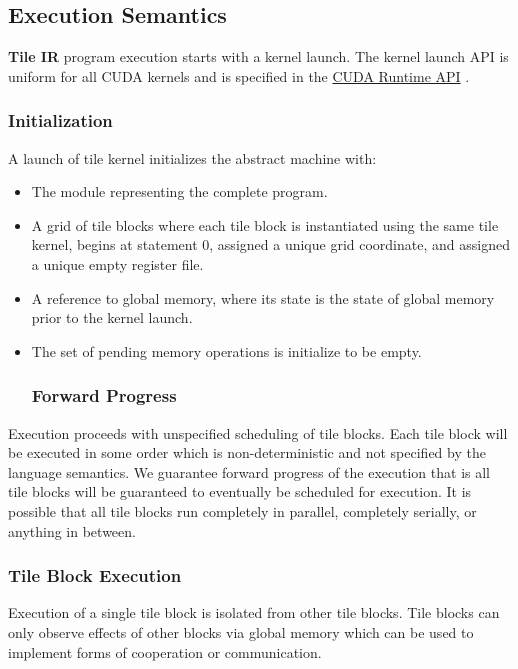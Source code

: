 \documentclass{article}
\begin{document}
\subsection{Execution Semantics}

\textbf{Tile IR} program execution starts with a kernel launch. The kernel launch API is uniform for all CUDA kernels and is specified in the \href{https://docs.nvidia.com/cuda/cuda-runtime-api/index.html}{CUDA Runtime API} .


\subsubsection{Initialization}

A launch of tile kernel initializes the abstract machine with:


\begin{itemize}
\item The module representing the complete program.
\item A grid of tile blocks where each tile block is instantiated using the same tile kernel, begins at statement 0, assigned a unique grid coordinate, and assigned a unique empty register file.
\item A reference to global memory, where its state is the state of global memory prior to the kernel launch.
\item The set of pending memory operations is initialize to be empty.


\subsubsection{Forward Progress}

\end{itemize}
Execution proceeds with unspecified scheduling of tile blocks. Each tile block will be executed in some order which is non-deterministic and not specified by the language semantics. We guarantee forward progress of the execution that is all tile blocks will be guaranteed to eventually be scheduled for execution. It is possible that all tile blocks run completely in parallel, completely serially, or anything in between.



\subsubsection{Tile Block Execution}

Execution of a single tile block is isolated from other tile blocks. Tile blocks can only observe effects of other blocks via global memory which can be used to implement forms of cooperation or communication.
\end{document}
